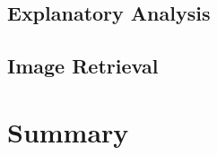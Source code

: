 \documentclass[UTF-8,a4paper,10pt]{article}
\begin{document}
\subsection{Explanatory Analysis}

\subsection{Image Retrieval}

\section{Summary}


\end{document}
